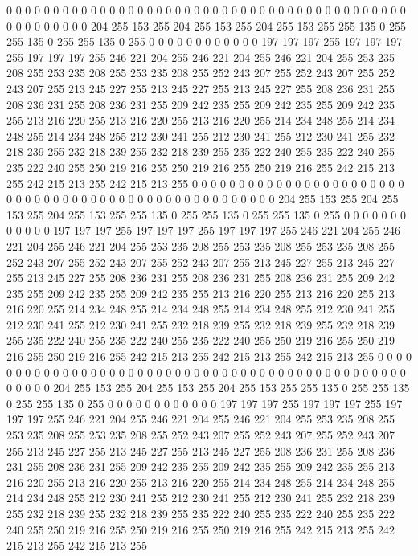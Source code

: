 0 0 0 0 0 0 0 0 0 0 0 0 0 0 0 0 0 0 0 0 0 0 0 0 0 0 0 0 0 0 0 0 0 0 0 0 0 0 0 0 0 0 0 0 0 0 0 0 0 0 0 0 204 255 153 255 204 255 153 255 204 255 153 255
255 135 0 255 255 135 0 255 255 135 0 255 0 0 0 0 0 0 0 0 0 0 0 0 197 197 197 255 197 197 197 255 197 197 197 255 246 221 204 255 246 221 204 255 246 221 204 255 253 235 208 255 253 235 208 255 253 235 208 255 252 243 207 255
252 243 207 255 252 243 207 255 213 245 227 255 213 245 227 255 213 245 227 255 208 236 231 255 208 236 231 255 208 236 231 255 209 242 235 255 209 242 235 255 209 242 235 255 213 216 220 255 213 216 220 255 213 216 220 255 214 234 248 255 214 234 248 255
214 234 248 255 212 230 241 255 212 230 241 255 212 230 241 255 232 218 239 255 232 218 239 255 232 218 239 255 235 222 240 255 235 222 240 255 235 222 240 255 250 219 216 255 250 219 216 255 250 219 216 255 242 215 213 255 242 215 213 255 242 215 213 255
0 0 0 0 0 0 0 0 0 0 0 0 0 0 0 0 0 0 0 0 0 0 0 0 0 0 0 0 0 0 0 0 0 0 0 0 0 0 0 0 0 0 0 0 0 0 0 0 0 0 0 0 204 255 153 255 204 255 153 255 204 255 153 255
255 135 0 255 255 135 0 255 255 135 0 255 0 0 0 0 0 0 0 0 0 0 0 0 197 197 197 255 197 197 197 255 197 197 197 255 246 221 204 255 246 221 204 255 246 221 204 255 253 235 208 255 253 235 208 255 253 235 208 255 252 243 207 255
252 243 207 255 252 243 207 255 213 245 227 255 213 245 227 255 213 245 227 255 208 236 231 255 208 236 231 255 208 236 231 255 209 242 235 255 209 242 235 255 209 242 235 255 213 216 220 255 213 216 220 255 213 216 220 255 214 234 248 255 214 234 248 255
214 234 248 255 212 230 241 255 212 230 241 255 212 230 241 255 232 218 239 255 232 218 239 255 232 218 239 255 235 222 240 255 235 222 240 255 235 222 240 255 250 219 216 255 250 219 216 255 250 219 216 255 242 215 213 255 242 215 213 255 242 215 213 255
0 0 0 0 0 0 0 0 0 0 0 0 0 0 0 0 0 0 0 0 0 0 0 0 0 0 0 0 0 0 0 0 0 0 0 0 0 0 0 0 0 0 0 0 0 0 0 0 0 0 0 0 204 255 153 255 204 255 153 255 204 255 153 255
255 135 0 255 255 135 0 255 255 135 0 255 0 0 0 0 0 0 0 0 0 0 0 0 197 197 197 255 197 197 197 255 197 197 197 255 246 221 204 255 246 221 204 255 246 221 204 255 253 235 208 255 253 235 208 255 253 235 208 255 252 243 207 255
252 243 207 255 252 243 207 255 213 245 227 255 213 245 227 255 213 245 227 255 208 236 231 255 208 236 231 255 208 236 231 255 209 242 235 255 209 242 235 255 209 242 235 255 213 216 220 255 213 216 220 255 213 216 220 255 214 234 248 255 214 234 248 255
214 234 248 255 212 230 241 255 212 230 241 255 212 230 241 255 232 218 239 255 232 218 239 255 232 218 239 255 235 222 240 255 235 222 240 255 235 222 240 255 250 219 216 255 250 219 216 255 250 219 216 255 242 215 213 255 242 215 213 255 242 215 213 255
